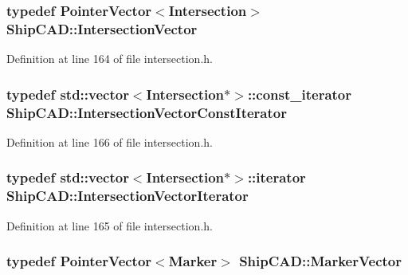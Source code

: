 \subsubsection[{\texorpdfstring{Intersection\+Vector}{IntersectionVector}}]{\setlength{\rightskip}{0pt plus 5cm}typedef {\bf Pointer\+Vector}$<${\bf Intersection}$>$ {\bf Ship\+C\+A\+D\+::\+Intersection\+Vector}}\hypertarget{namespaceShipCAD_a9910f0963197f9df6125398efd4fa139}{}\label{namespaceShipCAD_a9910f0963197f9df6125398efd4fa139}


Definition at line 164 of file intersection.\+h.

\subsubsection[{\texorpdfstring{Intersection\+Vector\+Const\+Iterator}{IntersectionVectorConstIterator}}]{\setlength{\rightskip}{0pt plus 5cm}typedef std\+::vector$<${\bf Intersection}$\ast$$>$\+::const\+\_\+iterator {\bf Ship\+C\+A\+D\+::\+Intersection\+Vector\+Const\+Iterator}}\hypertarget{namespaceShipCAD_a354810638f1643d04b62af2d08fd21bd}{}\label{namespaceShipCAD_a354810638f1643d04b62af2d08fd21bd}


Definition at line 166 of file intersection.\+h.

\subsubsection[{\texorpdfstring{Intersection\+Vector\+Iterator}{IntersectionVectorIterator}}]{\setlength{\rightskip}{0pt plus 5cm}typedef std\+::vector$<${\bf Intersection}$\ast$$>$\+::iterator {\bf Ship\+C\+A\+D\+::\+Intersection\+Vector\+Iterator}}\hypertarget{namespaceShipCAD_af8171e2e69ad8453d540aa87b159ad75}{}\label{namespaceShipCAD_af8171e2e69ad8453d540aa87b159ad75}


Definition at line 165 of file intersection.\+h.

\subsubsection[{\texorpdfstring{Marker\+Vector}{MarkerVector}}]{\setlength{\rightskip}{0pt plus 5cm}typedef {\bf Pointer\+Vector}$<${\bf Marker}$>$ {\bf Ship\+C\+A\+D\+::\+Marker\+Vector}}\hypertarget{namespaceShipCAD_a36fff5b53986f6d6976afc749463ef22}{}\label{namespaceShipCAD_a36fff5b53986f6d6976afc749463ef22}


